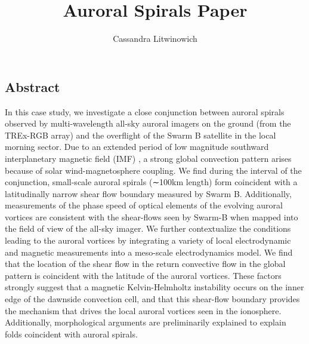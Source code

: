 \documentclass[12pt]{article}
\title{Auroral Spirals Paper }
\author{Cassandra Litwinowich}
\begin{document}
\maketitle

\begin{center}
\section{Abstract}
\end{center}
In this case study, we investigate a close 
conjunction between auroral spirals observed by 
multi-wavelength all-sky auroral imagers on the ground
(from the TREx-RGB array) and the overflight of the Swarm B
satellite in the local morning sector. Due to an extended period
of low magnitude southward interplanetary magnetic field (IMF)
, a strong global convection pattern arises because of solar
wind-magnetosphere coupling. We find during the interval of the
conjunction, small-scale auroral spirals (∼100km length) form
coincident with a latitudinally narrow shear flow boundary 
measured by Swarm B. Additionally, measurements of the phase
speed of optical elements of the evolving auroral vortices
are consistent with the shear-flows seen by Swarm-B when
mapped into the field of view of the all-sky imager.
We further contextualize the conditions leading to the
auroral vortices by integrating a variety of local
electrodynamic and magnetic measurements into a 
meso-scale electrodynamics model. We find that the
location of the shear flow in the return convective
flow in the global pattern is coincident with the latitude of
the auroral vortices. These factors strongly suggest that a 
magnetic Kelvin-Helmholtz instability occurs on the inner edge 
of the dawnside convection cell, and that this shear-flow 
boundary provides the mechanism that drives the local auroral 
vortices seen in the ionosphere. Additionally, morphological 
arguments are preliminarily explained to explain folds coincident
with auroral spirals.
\newpage
\end{document}
